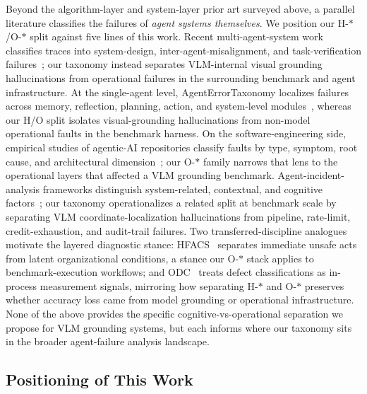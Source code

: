\documentclass[sigconf,nonacm]{acmart}
\begin{document}
Beyond the algorithm-layer and system-layer prior art surveyed
above, a parallel literature classifies the failures of
\emph{agent systems themselves}.  We position our
H-$\ast$/O-$\ast$ split against five lines of this work.
Recent multi-agent-system work classifies traces into
system-design, inter-agent-misalignment, and task-verification
failures~\cite{cemri2025mast}; our taxonomy instead separates
VLM-internal visual grounding hallucinations from operational
failures in the surrounding benchmark and agent infrastructure.
At the single-agent level, AgentErrorTaxonomy localizes
failures across memory, reflection, planning, action, and
system-level modules~\cite{zhu2025agenterror}, whereas our
H/O split isolates visual-grounding hallucinations from
non-model operational faults in the benchmark harness.
On the software-engineering side, empirical studies of
agentic-AI repositories classify faults by type, symptom,
root cause, and architectural
dimension~\cite{shah2026agenticfaults}; our O-$\ast$ family
narrows that lens to the operational layers that affected a
VLM grounding benchmark.
Agent-incident-analysis frameworks distinguish system-related,
contextual, and cognitive
factors~\cite{ezell2025incidentanalysis}; our taxonomy
operationalizes a related split at benchmark scale by
separating VLM coordinate-localization hallucinations from
pipeline, rate-limit, credit-exhaustion, and audit-trail
failures.
Two transferred-discipline analogues motivate the layered
diagnostic stance: HFACS~\cite{wiegmann2003hfacs} separates
immediate unsafe acts from latent organizational conditions,
a stance our O-$\ast$ stack applies to benchmark-execution
workflows; and ODC~\cite{chillarege1992odc} treats defect
classifications as in-process measurement signals, mirroring
how separating H-$\ast$ and O-$\ast$ preserves whether
accuracy loss came from model grounding or operational
infrastructure.
None of the above provides the specific
cognitive-vs-operational separation we propose for VLM
grounding systems, but each informs where our taxonomy sits
in the broader agent-failure analysis landscape.

\subsection{Positioning of This Work}
\end{document}
